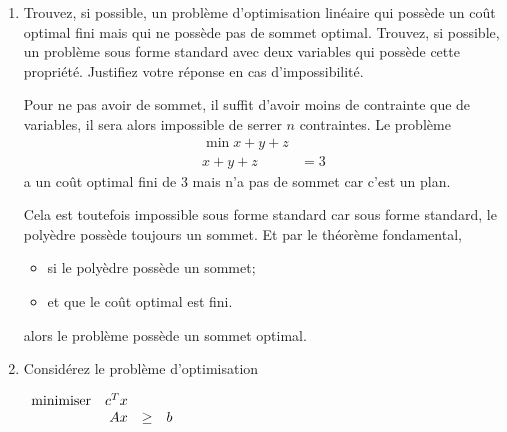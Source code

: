 \begin{enumerate}
\begin{solution}
\begin{proof}
        Dès lors, $\exists x \in \R^{n}$ tel que $x \notin \mathcal(B)$.
        Or, deux ensembles qui représentent un même polyèdre
        doivent avoir des contraintes communes.
        Il y a donc contradiction puisque, par hypothèse,
        l'espace ligne de $A$ forme une suite génératrice et $ k > m$.
        Le nombre de lignes de $B$ est donc supérieur au nombre de lignes de $A$
        et les lignes de $B$ sont linéairement dépendantes des lignes de $A$.
        La suite $g_{1}, \dots, g_{k}$ doit donc être génératrice.
      \end{proof}
    \end{solution}

  \item Trouvez, si possible, un problème d'optimisation linéaire qui possède un coût optimal fini mais qui ne possède pas de sommet optimal.
    Trouvez, si possible, un problème  sous forme standard avec deux variables qui possède cette propriété.  Justifiez votre réponse en cas
    d'impossibilité.

    \begin{solution}
      Pour ne pas avoir de sommet,
      il suffit d'avoir moins de contrainte que de variables,
      il sera alors impossible de serrer $n$ contraintes.
      Le problème
      \begin{align*}
        \min x + y + z\\
        x + y + z & = 3
      \end{align*}
      a un coût optimal fini de 3 mais n'a pas de sommet car c'est un plan.

      Cela est toutefois impossible sous forme standard car
      sous forme standard, le polyèdre possède toujours un sommet.
      Et par le théorème fondamental,
      \begin{itemize}
        \item si le polyèdre possède un sommet;
        \item et que le coût optimal est fini.
      \end{itemize}
      alors le problème possède un sommet optimal.
    \end{solution}

  \item     Considérez le problème d'optimisation

    $
    \begin{array}{lrcr}
      \mbox{minimiser} & c^T x \\
      & Ax & \geq & b
    \end{array}
    $


\end{enumerate}

